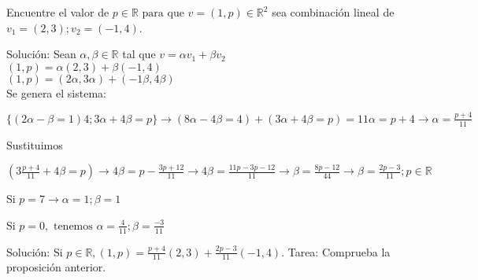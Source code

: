 \begin{ejem}

 Encuentre el valor de $p\in \mathbb{R} \text{ para que } v=(1,p)\in \mathbb{R}^2 $ sea combinaci\'{o}n lineal de $v_1=(2,3); v_2=(-1,4)$.

Soluci\'{o}n: Sean $\alpha,\beta \in \mathbb{R} $ tal que $v=\alpha v_1 + \beta v_2$\\ $(1,p) = \alpha(2,3)+\beta (-1,4)$\\ $(1,p) = (2\alpha,3\alpha)+ (-1\beta,4\beta)$\\

Se genera el sistema:

$\{(2\alpha-\beta = 1)4;3\alpha+4\beta = p\} \to (8\alpha - 4\beta = 4) + (3\alpha+4\beta = p) = 11\alpha = p + 4 \to \alpha = \frac{p+4}{11} $

Sustituimos

$(3\frac{p+4}{11}+4\beta = p)\to 4\beta = p -\frac{3p+12}{11} \to 4\beta = \frac{11p - 3p-12}{11} \to \beta = \frac{8p -12}{44} \to \beta = \frac{2p -3}{11}; p\in \mathbb{R} $

Si $p=7 \to \alpha = 1; \beta = 1$

Si $p=0, \text{ tenemos } \alpha=\frac{4}{11}; \beta=\frac{-3}{11}$

Soluci\'{o}n: Si $p\in \mathbb{R}, (1,p) = \frac{p+4}{11} (2,3) + \frac{2p-3}{11}(-1,4)$. Tarea: Comprueba la proposici\'{o}n anterior.
\end{ejem}



